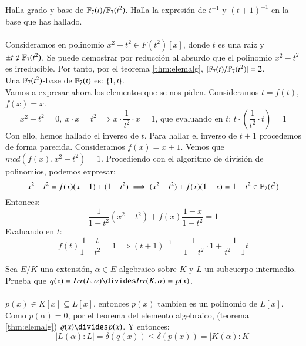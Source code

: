 \begin{ex}[H2.5]
    Halla grado y base de $\mathbb{F}_7(t) / \mathbb{F}_7(t^2)$. Halla la expresión de $t^{-1}$ y $(t+1)^{-1}$ en la base que has hallado.\\\\

    Consideramos en polinomio $x^2 - t^2 \in F(t^2)[x]$, donde $t$ es una raíz y $\pm t \notin \mathbb{F}_7(t^2)$. Se puede demostrar por reducción al absurdo que el polinomio $x^2 - t^2$ es irreducible. Por tanto, por el teorema \ref{thm:elemalg}, $|\mathbb{F}_7(t) / \mathbb{F}_7(t^2)| = 2$.\\
    Una $\mathbb{F}_7(t^2)$-base de $\mathbb{F}_7(t)$ es: $\left\{1, t\right\}$.\\

    Vamos a expresar ahora los elementos que se nos piden. Consideramos $t = f(t)$, $f(x) = x$.
    $$
        x^2 - t^2 = 0,\ x \cdot x = t^2 \implies x \cdot \frac{1}{t^2} \cdot x = 1\text{, que evaluando en $t$: } t \cdot \left(\frac{1}{t^2} \cdot t\right) = 1
    $$
    Con ello, hemos hallado el inverso de $t$. Para hallar el inverso de $t+1$ procedemos de forma parecida. Consideramos $f(x) = x + 1$.
    Vemos que $mcd(f(x), x^2 - t^2) = 1$. Procediendo con el algoritmo de división de polinomios, podemos expresar:
    $$
        x^2 - t^2 = f(x) (x - 1) + (1 - t^2) \implies (x^2 - t^2) + f(x)(1-x) = 1-t^2 \in \mathbb{F}_7(t^2)
    $$
    Entonces:
    $$
        \frac{1}{1 - t^2} (x^2 - t^2) + f(x) \frac{1-x}{1-t^2} = 1
    $$
    Evaluando en $t$:
    $$
        f(t)\frac{1-t}{1-t^2} = 1 \implies (t+1)^{-1} = \frac{1}{1-t^2} \cdot 1 + \frac{1}{t^2 - 1} t
    $$
\end{ex}

\begin{ex}[H2.10]
    Sea $E/K$ una extensión, $\alpha \in E$ algebraico sobre $K$ y $L$ un subcuerpo intermedio. Prueba que $q(x) = Irr(L, \alpha) \divides Irr(K, \alpha) = p(x)$.\\\\

    $p(x) \in K[x] \subseteq L[x]$, entonces $p(x)$ tambien es un polinomio de $L[x]$. Como $p(\alpha) = 0$, por el teorema del elemento algebraico, (teorema \ref{thm:elemalg}) $q(x) \divides p(x)$. Y entonces:
    $$
        |L(\alpha):L| = \delta(q(x)) \leq \delta(p(x)) = |K(\alpha):K|
    $$
\end{ex}

